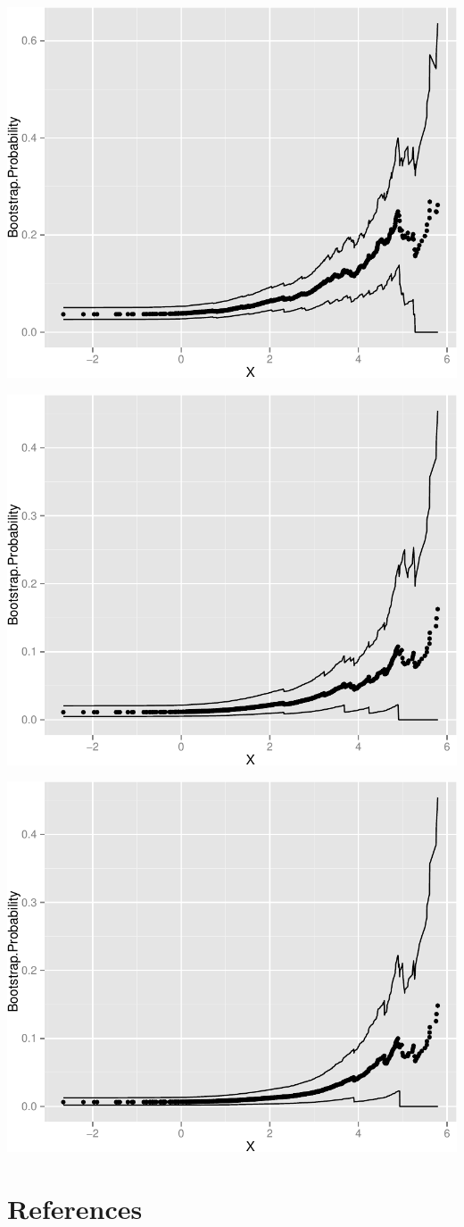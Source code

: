 \documentclass[11pt,]{article}
\begin{document}
\newpage

\includegraphics{manuscript_files/figure-latex/who_rec_low2_cp-1.pdf}
\newpage

\includegraphics{manuscript_files/figure-latex/who_rec_med1_cp-1.pdf}
\newpage

\includegraphics{manuscript_files/figure-latex/who_rec_med2_cp-1.pdf}
\newpage

\section*{References}\label{references}
\end{document}
